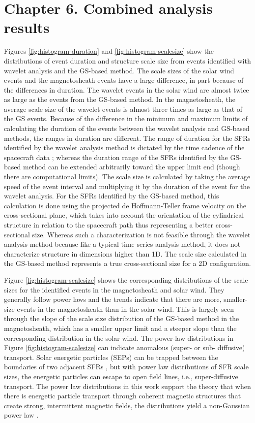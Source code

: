 \chapter{Chapter 6. Combined analysis results}
Figures \ref{fig:histogram-duration} and \ref{fig:histogram-scalesize} show the distributions of event duration and structure scale size from events identified with wavelet analysis and the GS-based method. The scale sizes of the solar wind events and the magnetosheath events have a large difference, in part because of the differences in duration. The wavelet events in the solar wind are almost twice as large as the events from the GS-based method. In the magnetosheath, the average scale size of the wavelet events is almost three times as large as that of the GS events. Because of the difference in the minimum and maximum limits of calculating the duration of the events between the wavelet analysis and GS-based methods, the ranges in duration are different. The range of duration for the SFRs identified by the wavelet analysis method is dictated by the time cadence of the spacecraft data \citep{Torrence:1998}; whereas the duration range of the SFRs identified by the GS-based method can be extended arbitrarily toward the upper limit end (though there are computational limits). The scale size is calculated by taking the average speed of the event interval and multiplying it by the duration of the event for the wavelet analysis. For the SFRs identified by the GS-based method, this calculation is done using the projected de Hoffmann-Teller frame velocity on the cross-sectional plane, which takes into account the orientation of the cylindrical structure in relation to the spacecraft path thus representing a better cross-sectional size. Whereas such a characterization is not feasible through the wavelet analysis method because like a typical time-series analysis method, it does not characterize structure in dimensions higher than 1D. The scale size calculated in the GS-based method represents a true cross-sectional size for a 2D configuration. 

Figure \ref{fig:histogram-scalesize} shows the corresponding distributions of the scale sizes for the identified events in the magnetosheath and solar wind. They generally follow power laws and the trends indicate that there are more, smaller-size events in the magnetosheath than in the solar wind. This is largely seen through the slope of the scale size distribution of the GS-based method in the magnetosheath, which has a smaller upper limit and a steeper slope than the corresponding distribution in the solar wind. The power-law distributions in Figure \ref{fig:histogram-scalesize} can indicate anomalous (super- or sub- diffusive) transport. Solar energetic particles (SEPs) can be trapped between the boundaries of two adjacent SFRs \citep{leRoux:2023}, but with power law distributions of SFR scale sizes, the energetic particles can escape to open field lines, i.e., super-diffusive transport. The power law distributions in this work support the theory that when there is energetic particle transport through coherent magnetic structures that create strong, intermittent magnetic fields, the distributions yield a non-Gaussian power law \citep{leRoux:2021}.

